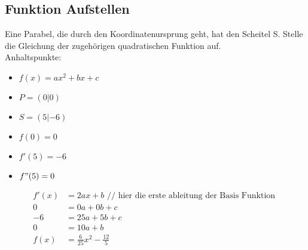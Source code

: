 \newpage
\subsection{Funktion Aufstellen}

Eine Parabel, die durch den Koordinatenursprung geht, hat den Scheitel S. Stelle die Gleichung der zugehörigen
quadratischen Funktion auf.\\

Anhaltspunkte:\\
\begin{itemize}
    \item $f(x) = ax^2+bx+c$
    \item $P=(0|0)$
    \item $S=(5|-6)$
    \item $f(0)=0$
    \item $f'(5)=-6$
    \item $f"(5)=0$
\end{itemize}

\begin{align*}
    f'(x) & = 2ax+b \mbox{ // hier die erste ableitung der Basis Funktion } \\
    0     & = 0a+0b+c                                                      \\
    -6    & = 25a+5b+c                                                     \\
    0     & = 10a+b                                                        \\
    f(x)  & = \frac{6}{25}x^2-\frac{12}{5}
\end{align*}